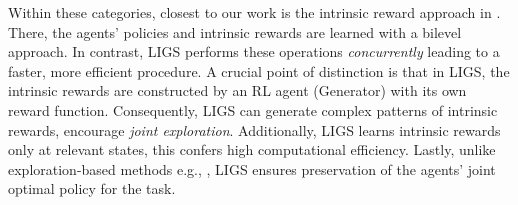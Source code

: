 \documentclass{article}
\begin{document}

Within these categories, closest to our work is the intrinsic reward approach in \cite{du2019liir}. There, the agents' policies and intrinsic rewards are learned with a bilevel approach. In contrast, LIGS performs these operations \textit{concurrently} leading to a faster, more efficient procedure.  A crucial point of distinction is that in LIGS, the intrinsic rewards are constructed by an RL agent ({\selectfont Generator}) with its own reward function. Consequently, LIGS can generate complex patterns of intrinsic rewards, encourage \textit{joint exploration}. Additionally, LIGS learns intrinsic rewards only at relevant states, this confers high computational efficiency.  Lastly, unlike exploration-based methods e.g., \cite{mahajan2019maven}, LIGS ensures preservation of the agents' joint optimal policy for the task.
% 
%
\end{document}
